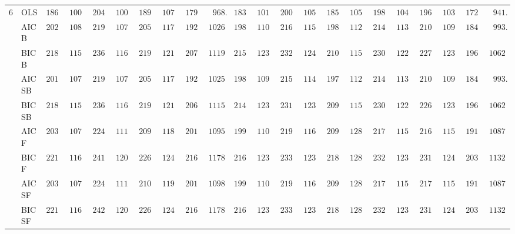 \begin{tabular}{ll|ll|llllll|llllll|llllll}
6 & OLS  & $1862.10$ & $1007.22$ & $2043.56$ & $1008.78$ & $1897.59$ & $1077.30$ & $1796.53$ & $\phantom{0}968.68$ & $1834.81$ & $1012.53$ & $2000.52$ & $1052.33$ & $1853.66$ & $1054.10$ & $1986.77$ & $1043.11$ & $1962.07$ & $1032.92$ & $1728.95$ & $\phantom{0}941.85$ \\
 & AIC B  & $2020.38$ & $1082.74$ & $2197.58$ & $1078.92$ & $2051.35$ & $1179.20$ & $1922.67$ & $1026.71$ & $1984.03$ & $1104.50$ & $2161.73$ & $1153.92$ & $1980.64$ & $1124.63$ & $2145.73$ & $1133.12$ & $2101.71$ & $1096.03$ & $1847.13$ & $\phantom{0}993.27$ \\
 & BIC B  & $2188.99$ & $1156.36$ & $2369.72$ & $1162.31$ & $2190.12$ & $1210.93$ & $2071.96$ & $1119.25$ & $2150.02$ & $1236.62$ & $2321.75$ & $1249.56$ & $2100.63$ & $1155.00$ & $2309.91$ & $1226.73$ & $2272.28$ & $1233.88$ & $1967.21$ & $1062.66$ \\
 & AIC SB  & $2017.39$ & $1077.21$ & $2197.58$ & $1078.92$ & $2050.88$ & $1178.59$ & $1921.64$ & $1025.53$ & $1980.99$ & $1096.71$ & $2157.83$ & $1149.88$ & $1979.34$ & $1123.34$ & $2142.84$ & $1131.17$ & $2101.71$ & $1096.03$ & $1846.56$ & $\phantom{0}993.65$ \\
 & BIC SB  & $2188.99$ & $1156.36$ & $2369.72$ & $1162.31$ & $2190.12$ & $1210.93$ & $2068.66$ & $1115.90$ & $2148.46$ & $1237.76$ & $2315.87$ & $1236.87$ & $2099.27$ & $1156.20$ & $2306.07$ & $1227.36$ & $2268.56$ & $1233.10$ & $1965.53$ & $1062.55$ \\
 & AIC F  & $2038.74$ & $1075.83$ & $2243.78$ & $1115.76$ & $2098.40$ & $1189.68$ & $2012.68$ & $1095.66$ & $1995.88$ & $1101.20$ & $2194.35$ & $1169.05$ & $2090.45$ & $1283.45$ & $2179.63$ & $1152.23$ & $2165.66$ & $1152.33$ & $1915.58$ & $1087.42$ \\
 & BIC F  & $2214.93$ & $1165.89$ & $2417.29$ & $1205.08$ & $2265.88$ & $1240.92$ & $2164.77$ & $1178.25$ & $2168.97$ & $1233.87$ & $2339.38$ & $1235.98$ & $2182.46$ & $1284.83$ & $2320.72$ & $1231.95$ & $2313.72$ & $1249.85$ & $2032.92$ & $1132.30$ \\
 & AIC SF  & $2039.41$ & $1077.35$ & $2244.43$ & $1115.40$ & $2101.31$ & $1191.36$ & $2014.72$ & $1098.59$ & $1995.85$ & $1101.23$ & $2195.56$ & $1169.31$ & $2094.56$ & $1287.42$ & $2179.86$ & $1152.09$ & $2170.95$ & $1156.95$ & $1916.98$ & $1087.32$ \\
 & BIC SF  & $2215.99$ & $1165.90$ & $2420.57$ & $1205.39$ & $2265.88$ & $1240.92$ & $2166.64$ & $1178.20$ & $2168.97$ & $1233.87$ & $2339.38$ & $1235.98$ & $2184.35$ & $1288.72$ & $2320.72$ & $1231.95$ & $2313.72$ & $1249.85$ & $2032.92$ & $1132.30$ \\

\end{tabular}
